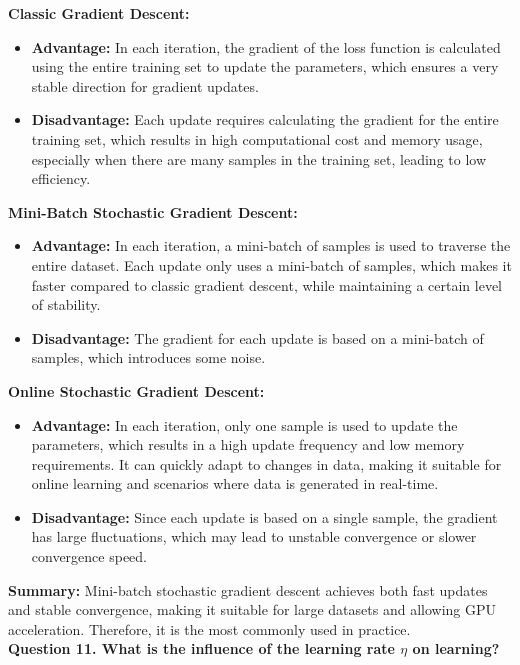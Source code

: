 \documentclass{article}
\begin{document}
\noindent \textbf{Classic Gradient Descent:}
\begin{itemize}
    \item \textbf{Advantage:} In each iteration, the gradient of the loss function is calculated using the entire training set to update the parameters, which ensures a very stable direction for gradient updates.
    \item \textbf{Disadvantage:} Each update requires calculating the gradient for the entire training set, which results in high computational cost and memory usage, especially when there are many samples in the training set, leading to low efficiency.
\end{itemize}

\noindent \textbf{Mini-Batch Stochastic Gradient Descent:}
\begin{itemize}
    \item \textbf{Advantage:} In each iteration, a mini-batch of samples is used to traverse the entire dataset. Each update only uses a mini-batch of samples, which makes it faster compared to classic gradient descent, while maintaining a certain level of stability.
    \item \textbf{Disadvantage:} The gradient for each update is based on a mini-batch of samples, which introduces some noise.
\end{itemize}

\noindent \textbf{Online Stochastic Gradient Descent:}
\begin{itemize}
    \item \textbf{Advantage:} In each iteration, only one sample is used to update the parameters, which results in a high update frequency and low memory requirements. It can quickly adapt to changes in data, making it suitable for online learning and scenarios where data is generated in real-time.
    \item \textbf{Disadvantage:} Since each update is based on a single sample, the gradient has large fluctuations, which may lead to unstable convergence or slower convergence speed.
\end{itemize}

\textbf{Summary:} Mini-batch stochastic gradient descent achieves both fast updates and stable convergence, making it suitable for large datasets and allowing GPU acceleration. Therefore, it is the most commonly used in practice.\\

\noindent \textbf{Question 11. What is the influence of the learning rate \(\eta\) on learning?}
\end{document}

